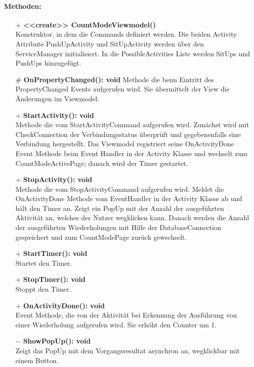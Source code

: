 \documentclass[a4paper,12pt]{article}
\begin{document}
\paragraph{Methoden:}
\begin{itemize}
	\item[+] \textbf{<<create>> CountModeViewmodel()} \\ Konstruktor, in dem die Commands definiert werden. Die beiden Activity Attribute PushUpActivity und SitUpActivity werden über den ServiceManager initialisiert. In die PossibleActivities Liste werden SitUps und PushUps hinzugefügt.
	\item[\#] \textbf{OnPropertyChanged(): void} Methode die beim Eintritt des PropertyChanged Events aufgerufen wird. Sie übermittelt der View die Änderungen im Viewmodel.
	\item[+] \textbf{StartActivity(): void} \\ Methode die vom StartActivityCommand aufgerufen wird. Zunächst wird mit CheckConnection der Verbindungsstatus überprüft und gegebenenfalls eine Verbindung hergestellt. Das Viewmodel registriert seine OnActivityDone Event Methode beim Event Handler in der Activity Klasse und wechselt zum CountModeActivePage; danach wird der Timer gestartet. 
	\item[+] \textbf{StopActivity(): void} \\ Methode die vom StopActivityCommand aufgerufen wird. Meldet die OnActivityDone Methode vom EventHandler in der Activity Klasse ab und hält den Timer an. Zeigt ein PopUp mit der Anzahl der ausgeführten Aktivität an, welches der Nutzer wegklicken kann. Danach werden die Anzahl der ausgeführten Wiederholungen mit Hilfe der DatabaseConnection gespeichert und zum CountModePage zurück gewechselt. 
	\item[+] \textbf{StartTimer(): void} \\ Startet den Timer. 
	\item[+] \textbf{StopTimer(): void} \\ Stoppt den Timer. 
	\item[+] \textbf{OnActivityDone(): void} \\ Event Methode, die von der Aktivität bei Erkennung der Ausführung von einer Wiederholung aufgerufen wird. Sie erhöht den Counter um 1. 
	\item[$-$] \textbf{ShowPopUp(): void} \\ Zeigt das PopUp mit dem Vorgangsresultat asynchron an, wegklickbar mit einem Button. 
\end{itemize}
\end{document}
